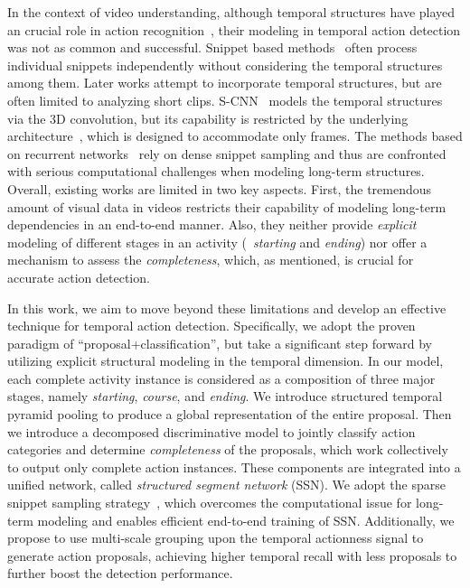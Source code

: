 \documentclass[10pt,twocolumn,letterpaper]{article}
\begin{document}
In the context of video understanding, although temporal structures have played an crucial role in action recognition~\cite{Niebles2010Modeling,Wang2014Latent,Pirsiavash2014SegGrammar,Wang2016TPP}, their modeling in temporal action detection was not as common and successful.
Snippet based methods~\cite{Mettes2015Bofrag,DBLP:journals/corr/SinghC16}
often process individual snippets independently without considering the temporal
structures among them.
Later works attempt to incorporate temporal structures, but are often limited to
analyzing short clips.
S-CNN~\cite{Shou2016SCNN} models the temporal structures via the 3D convolution,
but its capability
is restricted by the underlying architecture~\cite{Tran15C3D}, which is designed to
accommodate only  frames.
The methods based on recurrent networks~\cite{DonahueJ2015LRCN,Montes_2016_NIPSWS}
rely on dense snippet sampling and thus are confronted with serious computational
challenges when modeling long-term structures.
Overall, existing works are limited in two key aspects.
First, the tremendous amount of visual data in videos restricts their capability of modeling long-term dependencies in an end-to-end manner.
Also, they neither provide \emph{explicit} modeling of different
stages in an activity (\eg~\emph{starting} and \emph{ending}) nor offer a mechanism
to assess the \emph{completeness}, which, as mentioned, is crucial for accurate action
detection.


In this work, we aim to move beyond these limitations and develop an effective technique for temporal action detection.
Specifically, we adopt the proven paradigm of ``proposal+classification'', but take
a significant step forward by utilizing explicit structural modeling in the temporal dimension.
In our model, each complete activity instance is considered as a composition of
three major stages, namely \emph{starting}, \emph{course}, and \emph{ending}.
We introduce structured temporal pyramid pooling to
produce a global representation of the entire proposal.
Then we introduce a decomposed discriminative model to jointly classify action categories and determine \emph{completeness} of the proposals, which work collectively to output only complete action instances. 
These components are integrated
into a unified network, called \emph{structured segment network} (SSN).
We adopt the sparse snippet sampling strategy~\cite{Wang2016TSN}, which overcomes
the computational issue for long-term modeling and
enables efficient end-to-end training of SSN.
Additionally, we propose to use multi-scale grouping upon the temporal actionness signal to generate action proposals, achieving higher temporal recall with less proposals to further boost the detection performance.
\end{document}
